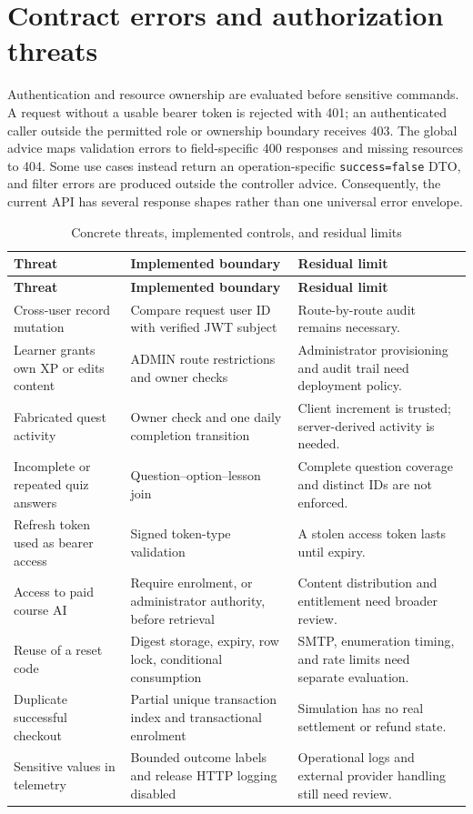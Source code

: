 \documentclass[12pt,a4paper,oneside]{report}
\begin{document}
\section{Contract errors and authorization threats}
Authentication and resource ownership are evaluated before sensitive commands. A
request without a usable bearer token is rejected with 401; an authenticated caller
outside the permitted role or ownership boundary receives 403. The global advice maps
validation errors to field-specific 400 responses and missing resources to 404. Some
use cases instead return an operation-specific \texttt{success=false} DTO, and filter
errors are produced outside the controller advice. Consequently, the current API has
several response shapes rather than one universal error envelope.

\begin{longtable}{P{0.26\textwidth}P{0.36\textwidth}P{0.27\textwidth}}
\caption{Concrete threats, implemented controls, and residual limits}\\\toprule
\textbf{Threat} & \textbf{Implemented boundary} & \textbf{Residual limit}\\\midrule\endfirsthead
\toprule\textbf{Threat} & \textbf{Implemented boundary} & \textbf{Residual limit}\\\midrule\endhead
Cross-user record mutation & Compare request user ID with verified JWT subject & Route-by-route audit remains necessary.\\
Learner grants own XP or edits content & ADMIN route restrictions and owner checks & Administrator provisioning and audit trail need deployment policy.\\
Fabricated quest activity & Owner check and one daily completion transition & Client increment is trusted; server-derived activity is needed.\\
Incomplete or repeated quiz answers & Question--option--lesson join & Complete question coverage and distinct IDs are not enforced.\\
Refresh token used as bearer access & Signed token-type validation & A stolen access token lasts until expiry.\\
Access to paid course AI & Require enrolment, or administrator authority, before retrieval & Content distribution and entitlement need broader review.\\
Reuse of a reset code & Digest storage, expiry, row lock, conditional consumption & SMTP, enumeration timing, and rate limits need separate evaluation.\\
Duplicate successful checkout & Partial unique transaction index and transactional enrolment & Simulation has no real settlement or refund state.\\
Sensitive values in telemetry & Bounded outcome labels and release HTTP logging disabled & Operational logs and external provider handling still need review.\\
\bottomrule
\end{longtable}
\end{document}

